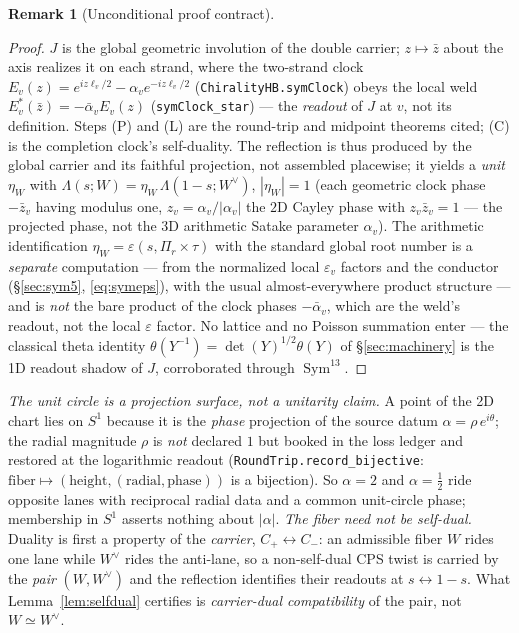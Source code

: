 \documentclass[11pt]{article}
\theoremstyle{definition}
\newtheorem{remark}[theorem]{Remark}
\newcommand{\Sym}{\operatorname{Sym}}
\begin{document}
\begin{remark}[Unconditional proof contract]
\begin{enumerate}
\begin{proof}
$J$ is the global geometric involution of the double carrier; $z\mapsto\bar z$ about the axis realizes it on
each strand, where the two-strand clock $E_v(z)=e^{iz\ell_v/2}-\alpha_v e^{-iz\ell_v/2}$
(\texttt{ChiralityHB.symClock}) obeys the local weld $E_v^{*}(\bar z)=-\bar\alpha_v E_v(z)$
(\texttt{symClock\_star}) --- the \emph{readout} of $J$ at $v$, not its definition. Steps (P) and (L) are the
round-trip and midpoint theorems cited; (C) is the completion clock's self-duality. The reflection is thus
produced by the global carrier and its faithful projection, not assembled placewise; it yields a \emph{unit}
$\eta_W$ with $\Lambda(s;W)=\eta_W\,\Lambda(1-s;W^\vee)$, $|\eta_W|=1$ (each geometric clock phase
$-\bar z_v$ having modulus one, $z_v=\alpha_v/|\alpha_v|$ the $2$D Cayley phase with $z_v\bar z_v=1$ --- the
projected phase, not the $3$D arithmetic Satake parameter $\alpha_v$). The arithmetic identification
$\eta_W=\varepsilon(s,\Pi_r\times\tau)$
with the standard global root number is a \emph{separate} computation --- from the normalized local
$\varepsilon_v$ factors and the conductor (\S\ref{sec:sym5}, \eqref{eq:symeps}), with the usual
almost-everywhere product structure --- and is \emph{not} the bare product of the clock phases $-\bar\alpha_v$,
which are the weld's readout, not the local $\varepsilon$ factor. No lattice and no Poisson summation enter ---
the classical theta identity $\theta(Y^{-1})=\det(Y)^{1/2}\theta(Y)$ of \S\ref{sec:machinery} is the 1D readout
shadow of $J$, corroborated through $\Sym^{13}$.
\end{proof}

\noindent\emph{The unit circle is a projection surface, not a unitarity claim.} A point of the 2D chart lies
on $S^1$ because it is the \emph{phase} projection of the source datum $\alpha=\rho\,e^{i\theta}$; the radial
magnitude $\rho$ is \emph{not} declared $1$ but booked in the loss ledger and restored at the logarithmic
readout (\texttt{RoundTrip.record\_bijective}: $\text{fiber}\mapsto(\text{height},(\text{radial},\text{phase}))$
is a bijection). So $\alpha=2$ and $\alpha=\tfrac12$ ride opposite lanes with reciprocal radial data and a
common unit-circle phase; membership in $S^1$ asserts nothing about $|\alpha|$. \emph{The fiber need not be
self-dual.} Duality is first a property of the \emph{carrier}, $C_+\leftrightarrow C_-$: an admissible fiber
$W$ rides one lane while $W^\vee$ rides the anti-lane, so a non-self-dual CPS twist is carried by the
\emph{pair} $(W,W^\vee)$ and the reflection identifies their readouts at $s\leftrightarrow1-s$. What
Lemma~\ref{lem:selfdual} certifies is \emph{carrier-dual compatibility} of the pair, not $W\simeq W^\vee$.


\end{enumerate}
\end{remark}
\end{document}
